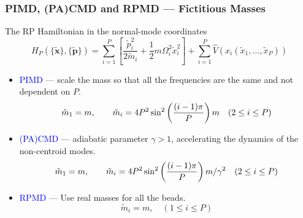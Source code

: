 \begin{frame}
  \frametitle{PIMD, (PA)CMD and RPMD --- Fictitious Masses}
  The RP Hamiltonian in the normal-mode coordinates
  \begin{equation*}
    H_P(\{\mathbf{\tilde{x}}\}, \{\mathbf{\tilde{p}}\}) =
    \sum_{i=1}^P
    \left[
      \frac{\tilde{p}_i^2}{2\tilde{m}_i}
      +
      \frac{1}{2} m \Omega_i^2 \tilde{x}_i^2
    \right]
      +
      \sum_{i=1}^P 
      \hat{V}\left(x_i(\tilde{x}_1,\ldots,\tilde{x}_P)\right)
  \end{equation*}
  \medskip
  \begin{itemize}
  \item \textcolor{blue}{{PIMD}} --- scale the mass so that all the frequencies are the
    same and not dependent on $P$.
    \begin{equation*}
      \tilde{m}_1 = m, \qquad \tilde{m}_i = 4P^2\sin^2\left({(i-1)\pi\over
          P}\right) m \quad (2 \le i \le P)
    \end{equation*}
  \item \textcolor{blue}{{(PA)CMD}} --- adiabatic parameter $\gamma > 1$, accelerating the dynamics of the non-centroid modes.
    \begin{equation*}
      \tilde{m}_1 = m, \qquad \tilde{m}_i = 4P^2\sin^2\left({(i-1)\pi\over
          P}\right) m / \gamma^2 \quad (2 \le i \le P)
    \end{equation*}
  \item \textcolor{blue}{{RPMD}} --- Use real masses for all the beads.
    \begin{equation*}
      \tilde{m}_i = m, \quad (1 \le i \le P)
    \end{equation*}
  \end{itemize}
\end{frame}
